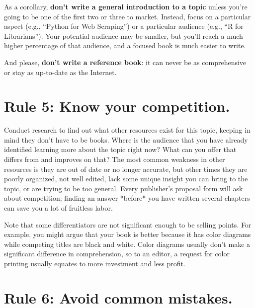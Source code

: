 \documentclass[10pt,letterpaper]{article}
\begin{document}
As a corollary,
\textbf{don't write a general introduction to a topic}
unless you're going to be one of the first two or three to market.
Instead,
focus on a particular aspect (e.g., ``Python for Web Scraping'')
or a particular audience (e.g., ``R for Librarians'').
Your potential audience may be smaller,
but you'll reach a much higher percentage of that audience,
and a focused book is much easier to write.

And please, \textbf{don't write a reference book}:
it can never be as comprehensive or stay as up-to-date as the Internet.

\section*{Rule 5: Know your competition.}

Conduct research to find out what other resources exist for this topic,
keeping in mind they don't have to be books.
Where is the audience that you have already identified learning more about the topic right now?
What can you offer that differs from and improves on that?
The most common weakness in other resources is they are out of date or no longer accurate,
but other times they are poorly organized,
not well edited,
lack some unique insight you can bring to the topic,
or are trying to be too general.
Every publisher's proposal form will ask about competition;
finding an answer *before* you have written several chapters
can save you a lot of fruitless labor.

Note that some differentiators are not significant enough to be selling points.
For example, you might argue that
your book is better because it has color diagrams while competing titles are black and white.
Color diagrams usually don't make a significant difference in comprehension,
so to an editor,
a request for color printing usually equates to more investment and less profit.

\section*{Rule 6: Avoid common mistakes.}
\end{document}
